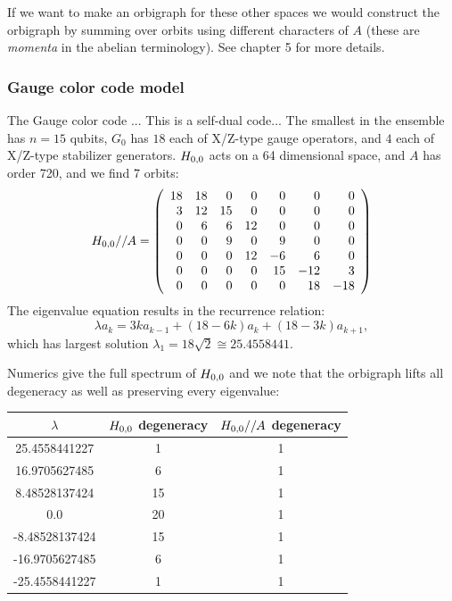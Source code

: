 \documentclass[12pt]{article}
\begin{document}
If we want to make an orbigraph for these other spaces we would construct
the orbigraph by
summing over orbits using different characters of $A$
(these are \emph{momenta} in the abelian terminology).
See \cite{Cvetkovic1980} chapter 5 for more details.

%
\subsubsection{Gauge color code model}
The Gauge color code \cite{Bombin2015,Bombin2015single}...
This is a self-dual code...
The smallest in the ensemble has $n=15$ qubits,
$G_0$ has $18$ each of X/Z-type gauge operators,
and $4$ each of X/Z-type stabilizer generators.
$H_{0,0}$ acts on a 64 dimensional space, and $A$ has
order 720, and we find 7 orbits:
$$
H_{0,0}//A = 
\left(\begin{array}{rrrrrrr}
18 & 18 &  0 &  0 &  0 &  0 &  0 \cr
  3 & 12 & 15 &  0 &  0 &  0 &  0 \cr
  0 &  6 &  6 & 12 &  0 &  0 &  0 \cr
  0 &  0 &  9 &  0 &  9 &  0 &  0 \cr
  0 &  0 &  0 & 12 & -6 &  6 &  0 \cr
  0 &  0 &  0 &  0 & 15 & -12 &  3 \cr
  0 &  0 &  0 &  0 &  0 & 18 & -18
\end{array}\right)
$$
The eigenvalue equation results in
the recurrence relation:
$$
    \lambda a_k = 3ka_{k-1} + (18-6k)a_k + (18-3k)a_{k+1},
$$
which has largest solution 
$\lambda_1 = 18\sqrt{2} \cong 25.4558441.$


Numerics give the full spectrum of $H_{0,0}$ and we note that the orbigraph lifts
all degeneracy as well as preserving every eigenvalue:
\begin{center}
\begin{tabular}{ c|c|c } 
$\lambda$ & $H_{0,0}$ degeneracy & $H_{0,0}//A$ degeneracy \\
\hline
    25.4558441227 & 1 & 1 \\
    16.9705627485 & 6 & 1 \\
    8.48528137424 & 15 & 1 \\
    0.0 & 20 & 1 \\
    -8.48528137424 & 15 & 1 \\
    -16.9705627485 & 6 & 1 \\
    -25.4558441227 & 1 & 1 \\
\end{tabular}
\end{center}
\end{document}

